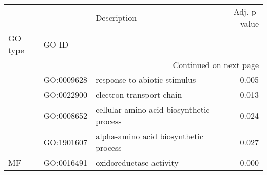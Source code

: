 \begin{longtable}{lllr}
\toprule
   &            &                               Description &  Adj. p-value \\
GO type & GO ID &                                           &               \\
\midrule
\endhead
\midrule
\multicolumn{4}{r}{{Continued on next page}} \\
\midrule
\endfoot

\bottomrule
\endlastfoot
\multirow{4}{*}{BP} & GO:0009628 &              response to abiotic stimulus &         0.005 \\
   & GO:0022900 &                  electron transport chain &         0.013 \\
   & GO:0008652 &  cellular amino acid biosynthetic process &         0.024 \\
   & GO:1901607 &     alpha-amino acid biosynthetic process &         0.027 \\
\cline{1-4}
MF & GO:0016491 &                   oxidoreductase activity &         0.000 \\
\end{longtable}
